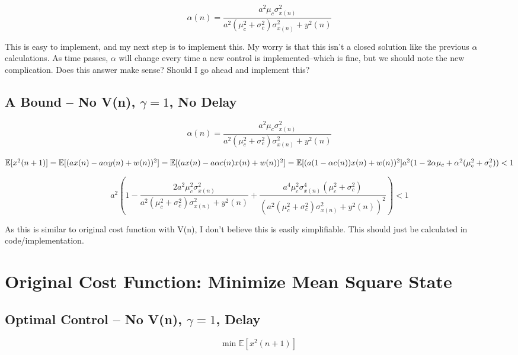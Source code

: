 \documentclass[14pt]{extarticle}
\begin{document}
\[ \alpha(n) = \frac{a^2 \mu_c \sigma_{x(n)}^2}{a^2 (\mu_c^2 + \sigma_c^2) \sigma_{x(n)}^2 + y^2(n)} \]

This is easy to implement, and my next step is to implement this. My worry is that this isn't a closed solution like the previous $\alpha$ calculations. As time passes, $\alpha$ will change every time a new control is implemented--which is fine, but we should note the new complication. Does this answer make sense? Should I go ahead and implement this?

\subsection{A Bound -- No V(n), $\gamma = 1$, No Delay}

\[ \alpha(n) = \frac{a^2 \mu_c \sigma_{x(n)}^2}{a^2 (\mu_c^2 + \sigma_c^2) \sigma_{x(n)}^2 + y^2(n)} \]

\begin{math}
\mathbb{E} [x^2(n+1)] \\
= \mathbb{E} [( ax(n) - a\alpha y(n) + w(n) )^2] \\
= \mathbb{E} [( ax(n) - a\alpha c(n)x(n) + w(n) )^2] \\
= \mathbb{E} [( a(1-\alpha c(n))x(n) + w(n) )^2 ] \\
a^2 (1 - 2\alpha \mu_c + \alpha^2 (\mu_c^2 + \sigma_c^2) ) < 1
\end{math}

\[ a^2 \left( 1 - \frac{2 a^2 \mu_c^2 \sigma_{x(n)}^2}{a^2 (\mu_c^2 + \sigma_c^2) \sigma_{x(n)}^2 + y^2(n)} + \frac{a^4 \mu_c^2 \sigma_{x(n)}^4 (\mu_c^2 + \sigma_c^2) }{(a^2 (\mu_c^2 + \sigma_c^2) \sigma_{x(n)}^2 + y^2(n))^2} \right) < 1 \]

As this is similar to original cost function with V(n), I don't believe this is easily simplifiable. This should just be calculated in code/implementation.

\section{Original Cost Function: Minimize Mean Square State}

\subsection{Optimal Control -- No V(n), $\gamma = 1$, Delay}

\[ \text{min } \mathbb{E} [x^2(n+1) ] \]
\end{document}
